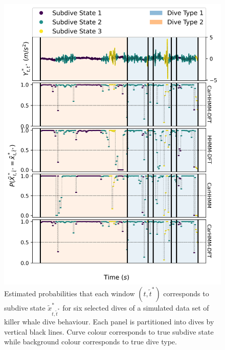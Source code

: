 \begin{figure}[ht]
    \centering
    \includegraphics[width=4.5in]{../Plots/Posterior_Fine_States.png}
    \caption{Estimated probabilities that each window $(t,\tilde t^*)$ corresponds to subdive state $\tilde x^*_{t,\tilde t^*}$ for six selected dives of a simulated data set of killer whale dive behaviour. Each panel is partitioned into dives by vertical black lines. Curve colour corresponds to true subdive state while background colour corresponds to true dive type.}
    \label{fig:acc_fine}
\end{figure}